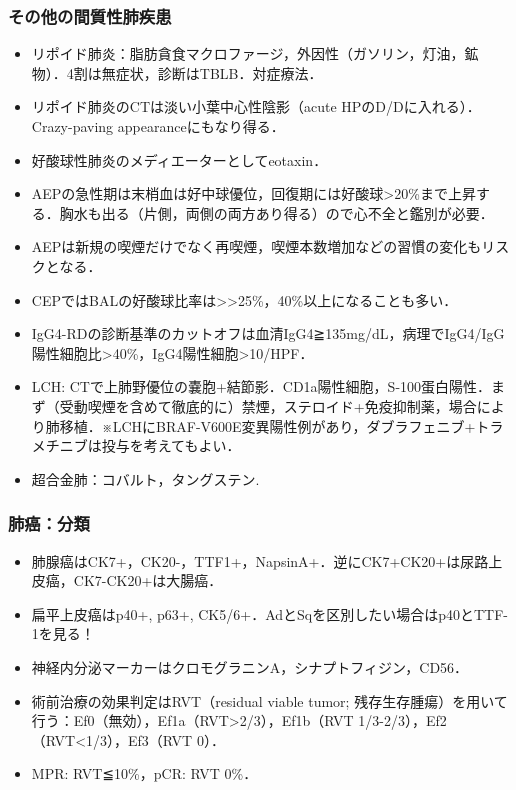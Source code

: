\subsubsection{その他の間質性肺疾患}

\begin{itemize}
\item リポイド肺炎：脂肪貪食マクロファージ，外因性（ガソリン，灯油，鉱物）．4割は無症状，診断はTBLB．対症療法．
\item リポイド肺炎のCTは淡い小葉中心性陰影（acute HPのD/Dに入れる）．Crazy-paving appearanceにもなり得る．
\item 好酸球性肺炎のメディエーターとしてeotaxin．
\item AEPの急性期は末梢血は好中球優位，回復期には好酸球>20\%まで上昇する．胸水も出る（片側，両側の両方あり得る）ので心不全と鑑別が必要．
\item AEPは新規の喫煙だけでなく再喫煙，喫煙本数増加などの習慣の変化もリスクとなる．
\item CEPではBALの好酸球比率は>>25\%，40\%以上になることも多い．
\item IgG4-RDの診断基準のカットオフは血清IgG4≧135mg/dL，病理でIgG4/IgG陽性細胞比>40\%，IgG4陽性細胞>10/HPF．
\item LCH: CTで上肺野優位の嚢胞+結節影．CD1a陽性細胞，S-100蛋白陽性．まず（受動喫煙を含めて徹底的に）禁煙，ステロイド+免疫抑制薬，場合により肺移植．※LCHにBRAF-V600E変異陽性例があり，ダブラフェニブ+トラメチニブは投与を考えてもよい．
\item 超合金肺：コバルト，タングステン.
\end{itemize}


\subsubsection{肺癌：分類}

\begin{itemize}
\item 肺腺癌はCK7+，CK20-，TTF1+，NapsinA+．逆にCK7+CK20+は尿路上皮癌，CK7-CK20+は大腸癌．
\item 扁平上皮癌はp40+, p63+, CK5/6+．AdとSqを区別したい場合はp40とTTF-1を見る！
\item 神経内分泌マーカーはクロモグラニンA，シナプトフィジン，CD56．
\item 術前治療の効果判定はRVT（residual viable tumor; 残存生存腫瘍）を用いて行う：Ef0（無効），Ef1a（RVT>2/3），Ef1b（RVT 1/3-2/3），Ef2（RVT<1/3），Ef3（RVT 0）．
\item MPR: RVT≦10\%，pCR: RVT 0\%．


\end{itemize}


